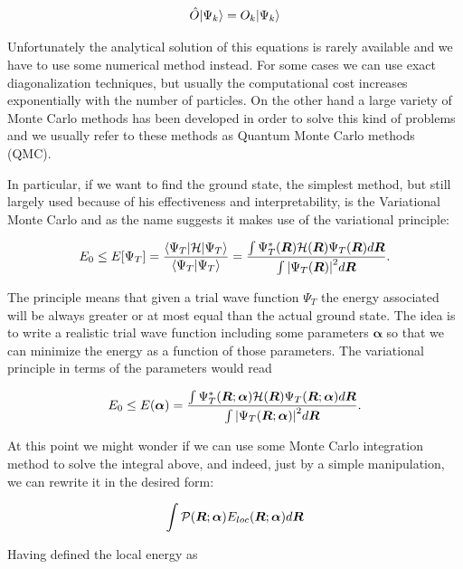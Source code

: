 \begin{equation}
  \hat{O}| \Psi_k \rangle=O_k| \Psi_k \rangle
\end{equation}

Unfortunately the analytical solution of this equations is rarely available and we have to use some numerical method instead.
For some cases we can use exact diagonalization techniques, but usually the computational cost increases exponentially with the number of particles.
On the other hand a large variety of Monte Carlo methods has been developed in order to solve this kind of problems and we usually refer to these methods as Quantum Monte Carlo methods (QMC).

In particular, if we want to find the ground state, the simplest method, but still largely used because of his effectiveness and interpretability, is the Variational Monte Carlo and as the name suggests it makes use of the variational principle:

\begin{equation}
  E_0\leq E[\Psi_T]=\dfrac{\langle \Psi_T|\mathcal{H}|\Psi_T \rangle}{\langle \Psi_T|\Psi_T \rangle}=\dfrac{\int \Psi_T^*(\bm{R})\mathcal{H}(\bm{R})\Psi_T(\bm{R})d\bm{R}}{\int {| \Psi_T(\bm{R}) |}^2d\bm{R}}.
\end{equation}

The principle means that given a trial wave function $\Psi_T$ the energy associated will be always greater or at most equal than the actual ground state.
The idea is to write a realistic trial wave function including some parameters ${\bm{\alpha}}$ so that we can minimize the energy as a function of those parameters.
The variational principle in terms of the parameters would read

\begin{equation}
  E_0\leq E({\bm{\alpha}})=\dfrac{\int \Psi_T^*(\bm{R};{\bm{\alpha}})\mathcal{H}(\bm{R})\Psi_T(\bm{R};{\bm{\alpha}})d\bm{R}}{\int {| \Psi_T(\bm{R};{\bm{\alpha}}) |}^2d\bm{R}}.
\end{equation}

At this point we might wonder if we can use some Monte Carlo integration method to solve the integral above, and indeed, just by a simple manipulation, we can rewrite it in the desired form:

\begin{equation}
  \int \mathcal{P}(\bm{R};\bm{\alpha})E_{loc}(\bm{R};\bm{\alpha})d\bm{R}
\end{equation}

Having defined the local energy as

